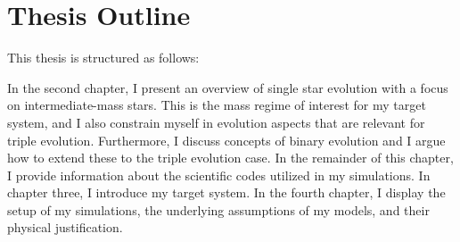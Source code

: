 \section{Thesis Outline}
This thesis is structured as follows: 

In the second chapter, I present an overview of single star evolution with a focus on intermediate-mass stars. This is the mass regime of interest for my target system, and I also constrain myself in evolution aspects that are relevant for triple evolution. Furthermore, I discuss concepts of binary evolution and I argue how to extend these to the triple evolution case. In the remainder of this chapter, I provide information about the scientific codes utilized in my simulations. In chapter three, I introduce my target system. In the fourth chapter, I display the setup of my simulations, the underlying assumptions of my models, and their physical justification.



